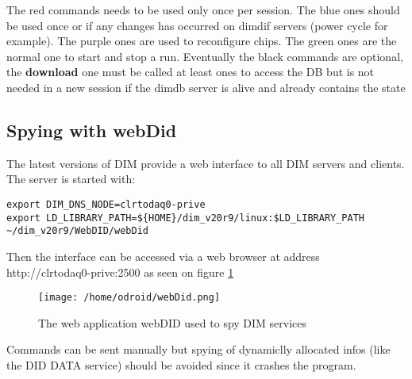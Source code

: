 \documentclass[english]{article}
\begin{document}
The red commands needs to be used only once per session. The blue ones should be used once or if any changes has occurred on dimdif servers (power cycle for example). The purple ones are used to reconfigure chips. The green ones are the normal one to start and stop a run. Eventually the black commands are optional, the {\bf download} one must be called at least ones to access the DB but is not needed in a new session if the dimdb server is alive and already contains the state 
\subsection{Spying with webDid}
The latest versions of DIM provide a web interface to all DIM servers and clients. The server is started with:
\begin{verbatim}
export DIM_DNS_NODE=clrtodaq0-prive
export LD_LIBRARY_PATH=${HOME}/dim_v20r9/linux:$LD_LIBRARY_PATH
~/dim_v20r9/WebDID/webDid
\end{verbatim}

Then the interface can be accessed via a web browser at address http://clrtodaq0-prive:2500 as seen on figure \ref{webdid}
\begin{figure}[htp]
\centering
\texttt{[image: /home/odroid/webDid.png]}
\caption{The web application webDID used to spy DIM services}
\label{webdid}
\end{figure}

Commands can be sent manually but spying of dynamiclly allocated infos (like the DID DATA service) should be avoided since it crashes the program. 
\end{document}
